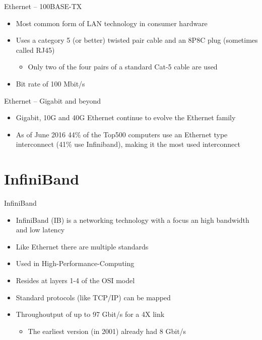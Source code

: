 \documentclass{beamer}
\begin{document}
\begin{frame}{Ethernet – 100BASE-TX}
\begin{itemize}
	\item Most common form of LAN technology in consumer hardware
	\item Uses a category 5 (or better) twisted pair cable and an 8P8C plug (sometimes called RJ45)
	\begin{itemize}	
		\item Only two of the four pairs of a standard Cat-5 cable are used
	\end{itemize}
	\item Bit rate of 100 Mbit/s
\end{itemize}
\end{frame}

\begin{frame}{Ethernet – Gigabit and beyond}
\begin{itemize}
	\item Gigabit, 10G and 40G Ethernet continue to evolve the Ethernet family
	\item As of June 2016 44\% of the Top500 computers use an Ethernet type interconnect (41\% use Infiniband), making it the most used interconnect
\end{itemize}
\end{frame}


\section{InfiniBand}

\begin{frame}{InfiniBand}
\begin{itemize}
	\item InfiniBand (IB) is a networking technology with a focus an high bandwidth and low latency
	\item Like Ethernet there are multiple standards
	\item Used in High-Performance-Computing
	\item Resides at layers 1-4 of the OSI model
	\item Standard protocols (like TCP/IP) can be mapped
	\item Throughoutput of up to 97 Gbit/s for a 4X link
	\begin{itemize}
		\item The earliest version (in 2001) already had 8 Gbit/s
	\end{itemize}
\end{itemize}
\end{frame}
\end{document}
